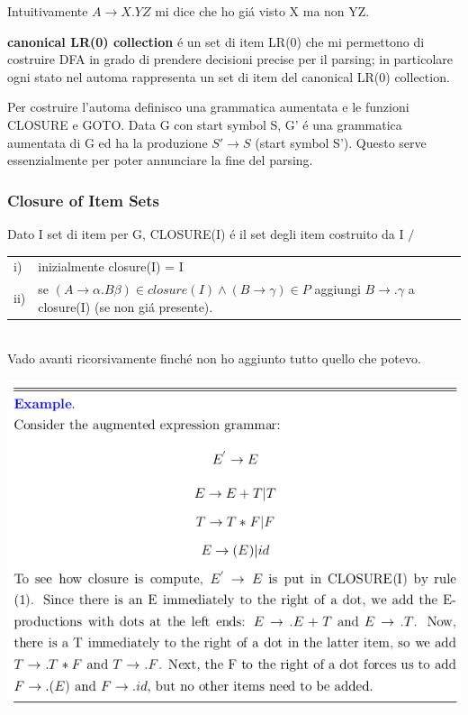 Intuitivamente $A \rightarrow X.YZ$ mi dice che ho gi\'a visto X ma non YZ.

\textbf{canonical LR(0) collection} \'e un set di item LR(0) che mi permettono di costruire DFA in grado di prendere decisioni
precise per il parsing; in particolare ogni stato nel automa rappresenta un set di item del canonical LR(0) collection.

Per costruire l'automa definisco una grammatica aumentata e le funzioni CLOSURE e GOTO. 
Data G con start symbol S, G' \'e una grammatica aumentata di G ed ha la produzione $S' \rightarrow S$ (start symbol S').
Questo serve essenzialmente per poter annunciare la fine del parsing.

\subsubsection{Closure of Item Sets}
Dato I set di item per G, CLOSURE(I) \'e il set degli item costruito da I $ / $ \\[5pt]
\begin{tabular}{ll}
    i)  &   inizialmente closure(I) = I \\
    ii) &   se $(A \rightarrow \alpha . B \beta) \in closure(I) \land (B \rightarrow \gamma) \in P$ 
           aggiungi $B \rightarrow .\gamma$ a closure(I) (se non gi\'a presente).\\
\end{tabular}\\[5pt]

Vado avanti ricorsivamente finch\'e non ho aggiunto tutto quello che potevo.

\begin{center}
    \includegraphics[scale=0.6]{Chapters/Img/c04_06.png}\\
\end{center}

